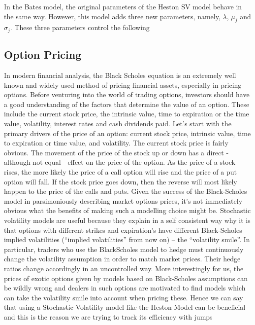 \documentclass{article}
\begin{document}
In the Bates model, the original parameters of the Heston SV model behave in the same way. However, this model adds three new parameters, namely, $\lambda$, $\mu_j$ and $\sigma_j$. These three parameters control the following

\subsection{Option Pricing}
In modern financial analysis, the Black Scholes equation is an extremely well known and widely used method of pricing financial assets, especially in pricing options. Before venturing into the world of trading options, investors should have a good understanding of the factors that determine the value of an option. These include the current stock price, the intrinsic value, time to expiration or the time value, volatility, interest rates and cash dividends paid. Let's start with the primary drivers of the price of an option: current stock price, intrinsic value, time to expiration or time value, and volatility. The current stock price is fairly obvious. The movement of the price of the stock up or down has a direct - although not equal - effect on the price of the option. As the price of a stock rises, the more likely the price of a call option will rise and the price of a put option will fall. If the stock price goes down, then the reverse will most likely happen to the price of the calls and puts. \citep{ref9} 
\newline\newline
Given the success of the Black-Scholes model in parsimoniously describing market options prices, it’s not immediately obvious what the benefits of making such a modelling choice might be. Stochastic volatility models are useful because they explain in a self consistent way why it is that options with different strikes and expiration's have different Black-Scholes implied volatilities (“implied volatilities” from now on) – the “volatility smile”. In particular, traders who use the BlackScholes model to hedge must continuously change the volatility assumption in order to match market prices. Their hedge ratios change accordingly in an uncontrolled way. More interestingly for us, the prices of exotic options given by models based on Black-Scholes assumptions can be wildly wrong and dealers in such options are motivated to find models which can take the volatility smile into account when pricing these.\citep{ref6} Hence we can say that using a Stochastic Volatility model like the Heston Model can be beneficial and this is the reason we are trying to track its efficiency with jumps
\end{document}
